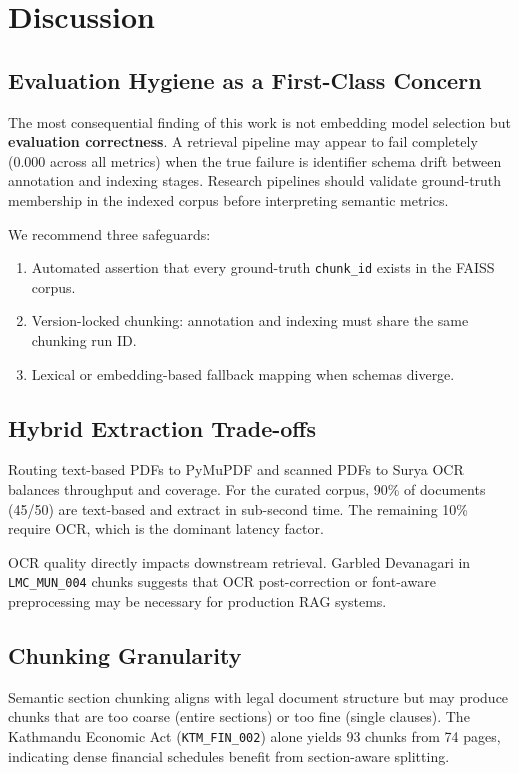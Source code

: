 \chapter{Discussion}
\label{ch:discussion}

\section{Evaluation Hygiene as a First-Class Concern}
The most consequential finding of this work is not embedding model selection but \textbf{evaluation correctness}. A retrieval pipeline may appear to fail completely (0.000 across all metrics) when the true failure is identifier schema drift between annotation and indexing stages. Research pipelines should validate ground-truth membership in the indexed corpus before interpreting semantic metrics.

We recommend three safeguards:
\begin{enumerate}[leftmargin=*]
  \item Automated assertion that every ground-truth \texttt{chunk\_id} exists in the FAISS corpus.
  \item Version-locked chunking: annotation and indexing must share the same chunking run ID.
  \item Lexical or embedding-based fallback mapping when schemas diverge.
\end{enumerate}

\section{Hybrid Extraction Trade-offs}
Routing text-based PDFs to PyMuPDF and scanned PDFs to Surya OCR balances throughput and coverage. For the curated corpus, 90\% of documents (45/50) are text-based and extract in sub-second time. The remaining 10\% require OCR, which is the dominant latency factor.

OCR quality directly impacts downstream retrieval. Garbled Devanagari in \texttt{LMC\_MUN\_004} chunks suggests that OCR post-correction or font-aware preprocessing may be necessary for production RAG systems.

\section{Chunking Granularity}
Semantic section chunking aligns with legal document structure but may produce chunks that are too coarse (entire sections) or too fine (single clauses). The Kathmandu Economic Act (\texttt{KTM\_FIN\_002}) alone yields 93 chunks from 74 pages, indicating dense financial schedules benefit from section-aware splitting.

